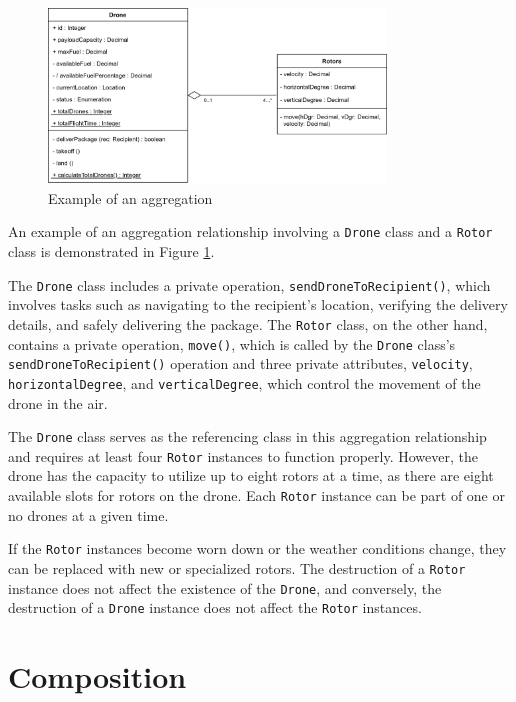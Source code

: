 \documentclass[
	12pt,
    a4paper,
    egregdoesnotlikesansseriftitles, %
    toc=chapterentrywithdots,
    oneside, openany,
    titlepage,
    parskip=half,
    headings=normal,  %
    listof=totoc,
    bibliography=totocnumbered,
    index=totoc,
    captions=tableheading,  %
    listof=flat,
    numbers=noenddot, %
    final]
    {scrbook}
\begin{document}
\begin{figure}[h]
	\centering
	\includegraphics[width=0.8\textwidth]{figures/aggr_comp/aggr.jpg}
	\caption[Example aggregation]{Example of an aggregation}
	\label{fig:aggregation_example} 
\end{figure}


An example of an aggregation relationship involving a \texttt{Drone} class and a \texttt{Rotor} class is demonstrated in Figure \ref{fig:aggregation_example}. 

The \texttt{Drone} class includes a private operation, \texttt{sendDroneToRecipient()}, which involves tasks such as navigating to the recipient's location, verifying the delivery details, and safely delivering the package.
The \texttt{Rotor} class, on the other hand, contains a private operation, \texttt{move()}, which is called by the \texttt{Drone} class's \texttt{sendDroneToRecipient()} operation and three private attributes, \texttt{velocity}, \texttt{horizontalDegree}, and \texttt{verticalDegree}, which control the movement of the drone in the air. 

The \texttt{Drone} class serves as the referencing class in this aggregation relationship and requires at least four \texttt{Rotor} instances to function properly. 
However, the drone has the capacity to utilize up to eight rotors at a time, as there are eight available slots for rotors on the drone. 
Each \texttt{Rotor} instance can be part of one or no drones at a given time.

If the \texttt{Rotor} instances become worn down or the weather conditions change, they can be replaced with new or specialized rotors. 
The destruction of a \texttt{Rotor} instance does not affect the existence of the \texttt{Drone}, and conversely, the destruction of a \texttt{Drone} instance does not affect the \texttt{Rotor} instances.


\section{Composition}
\end{document}
